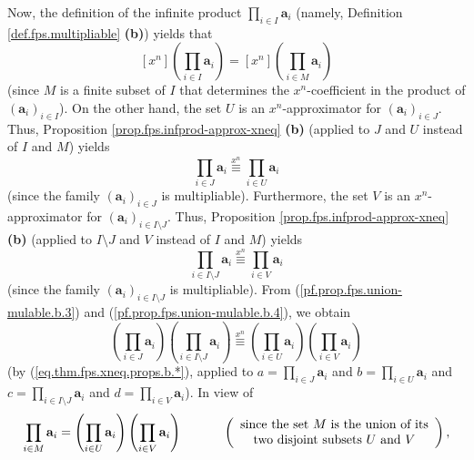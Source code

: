 

Now, the definition of the infinite product $\prod_{i\in I}\mathbf{a}_{i}$
(namely, Definition \ref{def.fps.multipliable} \textbf{(b)}) yields that%
\begin{equation}
\left[  x^{n}\right]  \left(  \prod_{i\in I}\mathbf{a}_{i}\right)  =\left[
x^{n}\right]  \left(  \prod_{i\in M}\mathbf{a}_{i}\right)
\label{pf.prop.fps.union-mulable.b.2}%
\end{equation}
(since $M$ is a finite subset of $I$ that determines the $x^{n}$-coefficient
in the product of $\left(  \mathbf{a}_{i}\right)  _{i\in I}$). On the other
hand, the set $U$ is an $x^{n}$-approximator for $\left(  \mathbf{a}%
_{i}\right)  _{i\in J}$. Thus, Proposition \ref{prop.fps.infprod-approx-xneq}
\textbf{(b)} (applied to $J$ and $U$ instead of $I$ and $M$) yields
\begin{equation}
\prod_{i\in J}\mathbf{a}_{i}\overset{x^{n}}{\equiv}\prod_{i\in U}%
\mathbf{a}_{i} \label{pf.prop.fps.union-mulable.b.3}%
\end{equation}
(since the family $\left(  \mathbf{a}_{i}\right)  _{i\in J}$ is multipliable).
Furthermore, the set $V$ is an $x^{n}$-approximator for $\left(
\mathbf{a}_{i}\right)  _{i\in I\setminus J}$. Thus, Proposition
\ref{prop.fps.infprod-approx-xneq} \textbf{(b)} (applied to $I\setminus J$ and
$V$ instead of $I$ and $M$) yields
\begin{equation}
\prod_{i\in I\setminus J}\mathbf{a}_{i}\overset{x^{n}}{\equiv}\prod_{i\in
V}\mathbf{a}_{i} \label{pf.prop.fps.union-mulable.b.4}%
\end{equation}
(since the family $\left(  \mathbf{a}_{i}\right)  _{i\in I\setminus J}$ is
multipliable). From (\ref{pf.prop.fps.union-mulable.b.3}) and
(\ref{pf.prop.fps.union-mulable.b.4}), we obtain%
\[
\left(  \prod_{i\in J}\mathbf{a}_{i}\right)  \left(  \prod_{i\in I\setminus
J}\mathbf{a}_{i}\right)  \overset{x^{n}}{\equiv}\left(  \prod_{i\in
U}\mathbf{a}_{i}\right)  \left(  \prod_{i\in V}\mathbf{a}_{i}\right)
\]
(by (\ref{eq.thm.fps.xneq.props.b.*}), applied to $a=\prod_{i\in J}%
\mathbf{a}_{i}$ and $b=\prod_{i\in U}\mathbf{a}_{i}$ and $c=\prod_{i\in
I\setminus J}\mathbf{a}_{i}$ and $d=\prod_{i\in V}\mathbf{a}_{i}$). In view
of
\[
\prod_{i\in M}\mathbf{a}_{i}=\left(  \prod_{i\in U}\mathbf{a}_{i}\right)
\left(  \prod_{i\in V}\mathbf{a}_{i}\right)  \ \ \ \ \ \ \ \ \ \ \left(
\begin{array}
[c]{c}%
\text{since the set }M\text{ is the union of its}\\
\text{two disjoint subsets }U\text{ and }V
\end{array}
\right)  ,
\]
